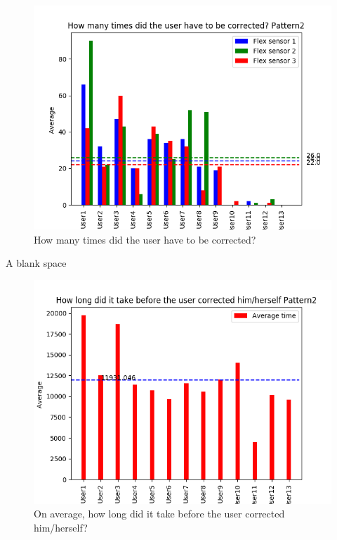 \documentclass[sigconf]{acmart}
\begin{document}
\begin{figure}[hb]
\centering
\includegraphics[width=1\columnwidth, scale=1]{p2_q1.png}
\caption{How many times did the user have to be corrected?}
\end{figure}
{\color{white} A blank space } \linebreak

\begin{figure}[ht]
\centering
\includegraphics[width=1\columnwidth, scale=1]{p2_q2.png}
\caption{On average, how long did it take before the user corrected him/herself?}
\end{figure}
\end{document}
